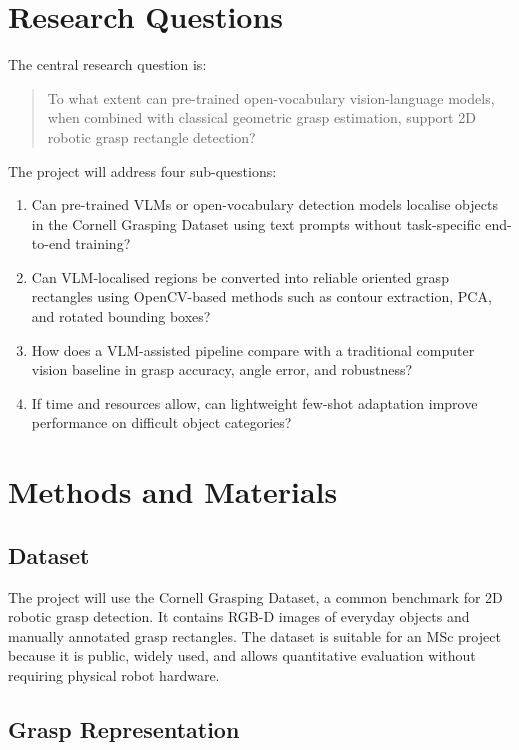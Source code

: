 \documentclass[11pt,a4paper]{article}
\begin{document}
\section{Research Questions}

The central research question is:

\begin{quote}
To what extent can pre-trained open-vocabulary vision-language models, when combined with classical geometric grasp estimation, support 2D robotic grasp rectangle detection?
\end{quote}

The project will address four sub-questions:

\begin{enumerate}
    \item Can pre-trained VLMs or open-vocabulary detection models localise objects in the Cornell Grasping Dataset using text prompts without task-specific end-to-end training?
    \item Can VLM-localised regions be converted into reliable oriented grasp rectangles using OpenCV-based methods such as contour extraction, PCA, and rotated bounding boxes?
    \item How does a VLM-assisted pipeline compare with a traditional computer vision baseline in grasp accuracy, angle error, and robustness?
    \item If time and resources allow, can lightweight few-shot adaptation improve performance on difficult object categories?
\end{enumerate}

\section{Methods and Materials}

\subsection{Dataset}

The project will use the Cornell Grasping Dataset, a common benchmark for 2D robotic grasp detection. It contains RGB-D images of everyday objects and manually annotated grasp rectangles. The dataset is suitable for an MSc project because it is public, widely used, and allows quantitative evaluation without requiring physical robot hardware.

\subsection{Grasp Representation}
\end{document}
